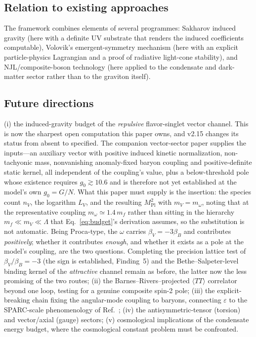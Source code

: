 \documentclass[11pt,a4paper]{article}
\begin{document}
\subsection{Relation to existing approaches}

The framework combines elements of several programmes:
Sakharov induced gravity \cite{Sakharov:1967pk} (here with a
definite UV substrate that renders the induced coefficients
computable), Volovik's emergent-symmetry mechanism
\cite{Volovik:2003fe} (here with an explicit particle-physics
Lagrangian and a proof of radiative light-cone stability), and
NJL/composite-boson technology
\cite{Nambu:1961tp,Akama:1978pg,Zee:1981,Amati:1982bp}
(here applied to the condensate and dark-matter sector rather than
to the graviton itself).

\subsection{Future directions}

(i) the induced-gravity budget of the \emph{repulsive}
flavor-singlet vector channel.  This is now the sharpest open
computation this paper owns, and v2.15 changes its status from
absent to specified.  The companion vector-sector paper supplies
the inputs---an auxiliary vector with positive induced kinetic
normalization, non-tachyonic mass, nonvanishing anomaly-fixed
baryon coupling and positive-definite static kernel, all
independent of the coupling's value, plus a below-threshold pole
whose existence requires $g_0 \gtrsim 10.6$ and is therefore not
yet established at the model's own $g_0 = G/N$.  What this paper
must supply is the insertion: the species count $n_V$, the
logarithm $L_V$, and the resulting $M_{\mathrm{Pl}}^2$ with
$m_V = m_\omega$, noting that at the representative coupling
$m_\omega \simeq 1.4\,m_f$ rather than sitting in the hierarchy
$m_f \ll m_V \ll \Lambda$ that Eq.~\eqref{eq:budget}'s
derivation assumes, so the substitution is not automatic.  Being
Proca-type, the $\omega$ carries $\beta_V = -3\beta_B$ and
contributes \emph{positively}; whether it contributes
\emph{enough}, and whether it exists as a pole at the model's
coupling, are the two questions.  Completing the precision lattice
test of $\beta_V/\beta_B = -3$ (the sign is established,
Finding~5) and the Bethe--Salpeter-level binding kernel of the
\emph{attractive} channel remain as before, the latter now the
less promising of the two routes;
(ii) the Barnes--Rivers--projected $\langle TT\rangle$ correlator
beyond one loop, testing for a genuine composite spin-2 pole;
(iii) the explicit-breaking chain fixing the angular-mode coupling
to baryons, connecting $\varepsilon$ to the SPARC-scale
phenomenology of Ref.~\cite{Cheng:2025sparc};
(iv) the antisymmetric-tensor (torsion) and vector/axial (gauge)
sectors;
(v) cosmological implications of the condensate energy budget,
where the cosmological constant problem must be confronted.
\end{document}
